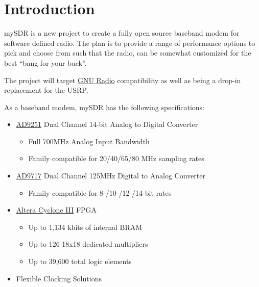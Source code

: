 \section{Introduction} %
\label{sec:intro}
    mySDR is a new project to create a fully open source baseband modem for software defined radio.
    The plan is to provide a range of performance options to pick and choose from such that the radio,
    can be somewhat customized for the best ``bang for your buck''.
    
    The project will target \href{http://gnuradio.org}{GNU Radio} compatibility as well as
    being a drop-in replacement for the USRP.
    
    As a baseband modem, mySDR has the following specifications:
    
    \begin{itemize}
        \item \href{http://www.analog.com/en/analog-to-digital-converters/ad-converters/ad9251/products/product.html}{AD9251} Dual Channel 14-bit Analog to Digital Converter
            \begin{itemize}
                \item Full 700MHz Analog Input Bandwidth
                \item Family compatible for 20/40/65/80 MHz sampling rates
            \end{itemize}
        \item \href{http://www.analog.com/en/digital-to-analog-converters/da-converters/ad9717/products/product.html}{AD9717} Dual Channel 125MHz Digital to Analog Converter
            \begin{itemize}
                \item Family compatible for 8-/10-/12-/14-bit rates
            \end{itemize}
        \item \href{http://www.altera.com/products/devices/cyclone3/overview/cy3-overview.html}{Altera Cyclone III} FPGA
            \begin{itemize}
                \item Up to 1,134 kbits of internal BRAM
                \item Up to 126 18x18 dedicated multipliers
                \item Up to 39,600 total logic elements
            \end{itemize}
        \item Flexible Clocking Solutions
            \begin{itemize}

\end{itemize}
\end{itemize}
